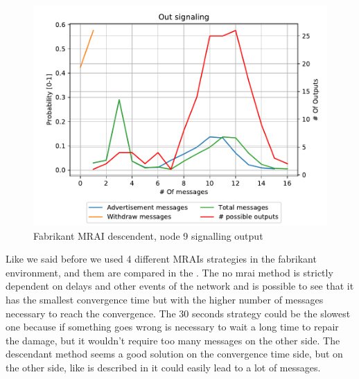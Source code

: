 \documentclass[10pt,conference,letterpaper]{IEEEtran}
\newcommand{\figwidth}{0.78}
\newcommand{\figvspace}{-1.5em}
\begin{document}
\begin{figure}[tb]
	\centering
	\includegraphics[width=\figwidth\columnwidth]{images/fabrikant/fabrikant-descendent/results_9_signaling_nmessage_prob}
	\caption{Fabrikant MRAI descendent, node 9 signalling output}
	\label{fig:fabr_descendent_9_signaling}
	\vspace{\figvspace}
\end{figure}

Like we said before we used 4 different \ac{MRAI}s strategies in the fabrikant
environment, and them are compared in the .
The no mrai method is strictly dependent on delays and other events of the network
and is possible to see that it has the smallest convergence time but with the higher
number of messages necessary to reach the convergence.
The \num{30} seconds strategy could be the slowest one because if something goes
wrong is necessary to wait a long time to repair the damage, but it wouldn't
require too many messages on the other side.
The descendant method seems a good solution on the convergence time side, but
on the other side, like is described in \cite{fabrikant} it could easily lead
to a lot of messages.
\end{document}
